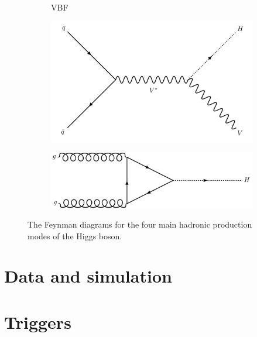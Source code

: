 \begin{figure}[htbp]
\begin{subfigure}[b]{0.45\textwidth}
        \caption{VBF}
    \end{subfigure}
    \begin{subfigure}[b]{0.45\textwidth}
        \includegraphics[width=\textwidth]{feynman_diagrams/VH.png}
        \caption{\VH}
    \end{subfigure}
    \hfill
    \begin{subfigure}[b]{0.45\textwidth}
        \includegraphics[width=\textwidth]{feynman_diagrams/ggF.png}
        \caption{\ggF}
    \end{subfigure}
\caption{The Feynman diagrams for the four main hadronic production modes of the Higgs boson.} %
\label{fig:higgs_feynman_diagrams}
\end{figure}

\section{Data and simulation}
\label{sec:htoinv_data_sim}


\section{Triggers}
\label{sec:htoinv_triggers}


